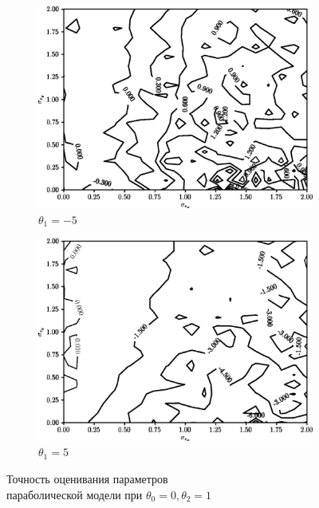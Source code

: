 \begin{figure}[p]
  \begin{subfigure}[b]{\linewidth}
    \centering
    \includegraphics[width=135mm]{fig/nonlinear/quadratic/a-0_b--5_c-1.png}
    \caption{\( \theta_1 = -5 \)}\label{fig:comparison_nonlinear_quadratic_a-0_b--5_c-1}
  \end{subfigure}

  \vspace{2\baselineskip}
  \begin{subfigure}[b]{\linewidth}
    \centering
    \includegraphics[width=135mm]{fig/nonlinear/quadratic/a-0_b-5_c-1.png}
    \caption{\( \theta_1 = 5 \)}\label{fig:comparison_nonlinear_quadratic_a-0_b-5_c-1}
  \end{subfigure}

  \vspace{\baselineskip}
  \caption{
    Точность оценивания параметров \\
    параболической модели при \( \theta_0 = 0, \theta_2 = 1 \)
  }\label{fig:comparison_nonlinear_quadratic_a-0_c-1}
\end{figure}

